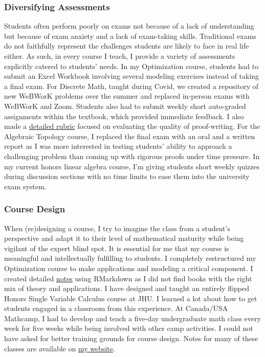 \documentclass[
]{report}
\begin{document}
\hypertarget{diversifying-assessments}{%
\subsubsection*{Diversifying Assessments}\label{diversifying-assessments}}


Students often perform poorly on exams not because of a lack of understanding but because of exam anxiety and a lack of exam-taking skills. Traditional exams do not faithfully represent the challenges students are likely to face in real life either. As such, in every course I teach, I provide a variety of assessments explicitly catered to students' needs. In my Optimization course, students had to submit an Excel Workbook involving several modeling exercises instead of taking a final exam.
For Discrete Math, taught during Covid, we created a repository of new WeBWorK problems over the summer and replaced in-person exams with WeBWorK and Zoom.
Students also had to submit weekly short auto-graded assignments within the textbook, which provided immediate feedback. I also made a \protect\hyperlink{rubric-for-grading-proofs}{detailed rubric} focused on evaluating the quality of proof-writing. For the Algebraic Topology course, I replaced the final exam with an oral and a written report as I was more interested in testing students' ability to approach a challenging problem than coming up with rigorous proofs under time pressure.
In my current honors linear algebra course, I'm giving students short weekly quizzes during discussion sections with no time limits to ease them into the university exam system.

\hypertarget{course-design}{%
\subsubsection*{Course Design}\label{course-design}}


When (re)designing a course, I try to imagine the class from a student's perspective and adapt it to their level of mathematical maturity while being vigilant of the expert blind spot. It is essential for me that my course is meaningful and intellectually fulfilling to students. I completely restructured my Optimization course to make applications and modeling a critical component. I created detailed \href{https://apurvanakade.github.io/Introduction-to-Optimization/}{notes} using RMarkdown as I did not find books with the right mix of theory and applications. I have designed and taught an entirely flipped Honors Single Variable Calculus course at JHU. I learned a lot about how to get students engaged in a classroom from this experience.
At Canada/USA Mathcamp, I had to develop and teach a five-day undergraduate math class every week for five weeks while being involved with other camp activities.
I could not have asked for better training grounds for course design.
Notes for many of these classes are available on \href{https://apurvanakade.github.io/math-notes.html}{my website}.
\end{document}
